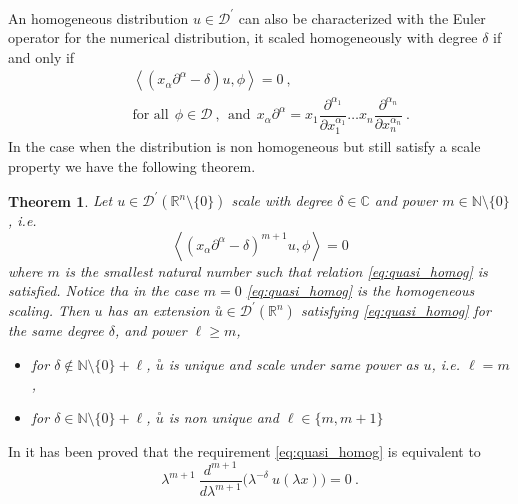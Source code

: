 \documentclass[11pt]{book}
\newcommand{\sm}[1]{\left\langle#1\right\rangle}
\newcommand{\exte}[1]{\overset{\circ}{#1}}
\newcommand{\Dcal}{\mathcal{D}}
\newcommand{\Cbb}{\mathbb{C}}
\newcommand{\Nbb}{\mathbb{N}}
\newcommand{\Rbb}{\mathbb{R}}
\theoremstyle{break}
\newtheorem{theorem}{Theorem}[chapter]
\begin{document}
An homogeneous distribution $u \in \Dcal^\prime$ can also be characterized with the Euler operator for the numerical distribution, it scaled homogeneously with degree $\delta$ if and only if 
%
\begin{eqnarray*}
&& \sm{\left(x_\alpha \partial^\alpha - \delta \right) u ,\phi} =  0 \ , \\
&& \mbox{for all} \ \ \phi \in \Dcal \ , \ \ \mbox{and} \ \ x_\alpha \partial^\alpha = x_1 \dfrac{\partial^{\alpha_1}}{\partial x_1^{\alpha_1}} \dots x_n \dfrac{\partial^{\alpha_n}}{\partial x_n^{\alpha_n}} \ .
\end{eqnarray*}
%
In the case when the distribution is non homogeneous but still satisfy a scale property we have the following theorem.
%
\begin{theorem}\label{theo:almost_homo_numeric}
Let $u \in \Dcal^\prime(\Rbb^n\setminus\{0\})$ scale with degree $\delta\in\Cbb$ and power $m\in\Nbb\setminus\{0\}$, i.e.
%
\begin{equation}
\sm{\left(x_\alpha \partial^\alpha - \delta \right)^{m+1} u , \phi } =  0
\label{eq:quasi_homog}
\end{equation}
%
where $m$ is the smallest natural number such that relation \eqref{eq:quasi_homog} is satisfied. Notice tha in the case $m=0$ \eqref{eq:quasi_homog} is the homogeneous scaling. Then $u$ has an extension $\exte{u}\in\Dcal^\prime(\Rbb^n)$ satisfying \eqref{eq:quasi_homog} for the same degree $\delta$, and power $\ell \geq m$,
%
\begin{itemize}
\item for $\delta \notin \Nbb \setminus \{0\} + \ell$, $\exte{u}$ is unique and scale under same power as $u$, i.e. $\ell=m$,
%
\item for $\delta \in \Nbb \setminus \{0\} + \ell$, $\exte{u}$ is non unique and $\ell\in\{ m , m+1 \}$
\end{itemize}
%
\end{theorem}

In \cite{duetsch_causal_2004} it has been proved that the requirement \eqref{eq:quasi_homog} is equivalent to 
%
\begin{equation}
\lambda^{m+1} \ \dfrac{d^{m+1}}{d\lambda^{m+1}} \bigg( \lambda^{-\delta}  \ u(\lambda x ) \bigg) = 0 \ .
\label{eq:quasi_euler_numeric}
\end{equation}
\end{document}

